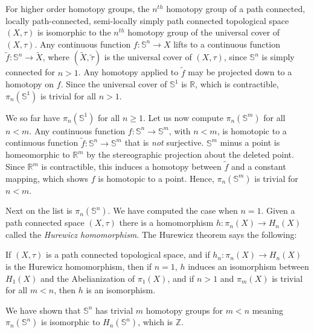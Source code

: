 \documentclass{beamer}
\begin{document}
    \begin{frame}
        For higher order homotopy groups, the $n^{th}$ homotopy group of a path
        connected, locally path-connected, semi-locally simply path connected
        topological space $(X,\tau)$ is isomorphic to the $n^{th}$ homotopy
        group of the universal cover of $(X,\tau)$. Any continuous function
        $f:\mathbb{S}^{n}\rightarrow{X}$ lifts to a continuous function
        $\tilde{f}:\mathbb{S}^{n}\rightarrow\tilde{X}$, where
        $(\tilde{X},\tilde{\tau})$ is the universal cover of $(X,\tau)$,
        since $\mathbb{S}^{n}$ is simply connected for $n>1$. Any
        homotopy applied to $\tilde{f}$ may be projected down to a homotopy on
        $f$. Since the universal cover of $\mathbb{S}^{1}$ is
        $\mathbb{R}$, which is contractible, $\pi_{n}(\mathbb{S}^{1})$ is
        trivial for all $n>1$.
    \end{frame}
    \begin{frame}
        We so far have $\pi_{n}(\mathbb{S}^{1})$ for all $n\geq{1}$. Let us now
        compute $\pi_{n}(\mathbb{S}^{m})$ for all $n<m$. Any continuous function
        $f:\mathbb{S}^{n}\rightarrow\mathbb{S}^{m}$, with $n<m$, is homotopic
        to a continuous function
        $\tilde{f}:\mathbb{S}^{n}\rightarrow\mathbb{S}^{m}$ that is
        \textit{not} surjective. $\mathbb{S}^{m}$ minus a point is homeomorphic
        to $\mathbb{R}^{m}$ by the stereographic projection about the deleted
        point. Since $\mathbb{R}^{m}$ is contractible, this induces a homotopy
        between $\tilde{f}$ and a constant mapping, which shows $f$ is homotopic
        to a point. Hence, $\pi_{n}(\mathbb{S}^{m})$ is trivial for
        $n<m$.
    \end{frame}
    \begin{frame}
        Next on the list is $\pi_{n}(\mathbb{S}^{n})$. We have computed the
        case when $n=1$. Given a path connected space $(X,\tau)$ there is a
        homomorphism $h:\pi_{n}(X)\rightarrow{H}_{n}(X)$ called the
        \textit{Hurewicz homomorphism}. The Hurewicz theorem says the following:
        \begin{theorem}
            If $(X,\tau)$ is a path connected topological space, and if
            $h_{n}:\pi_{n}(X)\rightarrow{H}_{n}(X)$ is the Hurewicz
            homomorphism, then if $n=1$, $h$ induces an isomorphism between
            $H_{1}(X)$ and the Abelianization of $\pi_{1}(X)$, and if $n>1$ and
            $\pi_{m}(X)$ is trivial for all $m<n$, then
            $h$ is an isomorphism.
        \end{theorem}
        We have shown that $\mathbb{S}^{n}$ has trivial $m$ homotopy groups for
        $m<n$ meaning $\pi_{n}(\mathbb{S}^{n})$ is isomorphic to
        $H_{n}(\mathbb{S}^{n})$, which is $\mathbb{Z}$.
    \end{frame}
\end{document}
